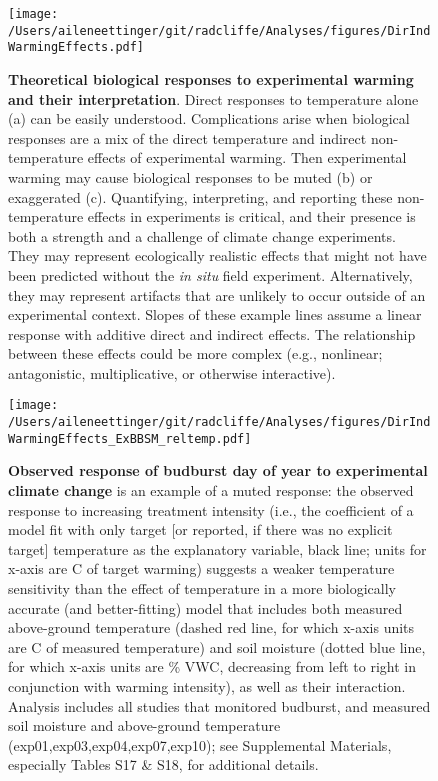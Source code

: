 \documentclass{article}
\begin{document}
 \begin{figure}[h]
\centering
 \texttt{[image: /Users/aileneettinger/git/radcliffe/Analyses/figures/DirIndWarmingEffects.pdf]} 
 \caption{\textbf{Theoretical biological responses to experimental warming and their interpretation}. Direct responses to temperature alone (a) can be easily understood. Complications arise when biological responses are a mix of the direct temperature and indirect non-temperature effects of experimental warming. Then experimental warming may cause biological responses to be muted (b) or exaggerated (c). Quantifying, interpreting, and reporting these non-temperature effects in experiments is critical, and their presence is both a strength and a challenge of climate change experiments. They may represent ecologically realistic effects that might not have been predicted without the \emph{in situ} field experiment. Alternatively, they may represent artifacts that are unlikely to occur outside of an experimental context. Slopes of these example lines assume a linear response with additive direct and indirect effects. The relationship between these effects could be more complex (e.g., nonlinear; antagonistic, multiplicative, or otherwise interactive).} 
\label{fig:biolimp}
\end{figure}

\begin{figure}[h]
\centering
 \texttt{[image: /Users/aileneettinger/git/radcliffe/Analyses/figures/DirIndWarmingEffects\_ExBBSM\_reltemp.pdf]} 
 \caption{\textbf{Observed response of budburst day of year to experimental climate change} is an example of a muted response: the observed response to increasing treatment intensity (i.e., the coefficient of a model fit with only target [or reported, if there was no explicit target] temperature as the explanatory variable, black line; units for x-axis are \degree C of target warming) suggests a weaker temperature sensitivity than the effect of temperature in a more biologically accurate (and better-fitting) model that includes both measured above-ground temperature (dashed red line, for which x-axis units are \degree C of measured temperature) and soil moisture (dotted blue line, for which x-axis units are \% VWC, decreasing from left to right in conjunction with warming intensity), as well as their interaction. Analysis includes all studies that monitored budburst, and measured soil moisture and above-ground temperature (exp01,exp03,exp04,exp07,exp10); see Supplemental Materials, especially Tables S17 \& S18, for additional details.} 
 
\label{fig:phen}
\end{figure}
 

\end{document}
